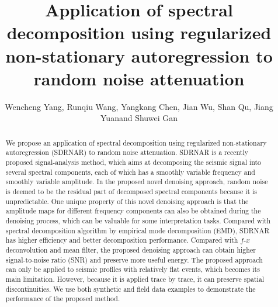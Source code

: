 
\title{Application of spectral decomposition using regularized non-stationary autoregression to random noise attenuation}
\renewcommand{\thefootnote}{\fnsymbol{footnote}}
\author{Wencheng Yang\footnotemark[1], Runqiu Wang\footnotemark[1], Yangkang Chen\footnotemark[2], Jian Wu\footnotemark[1], Shan Qu\footnotemark[1], Jiang Yuan\footnotemark[1] and Shuwei Gan\footnotemark[1]}
\address{
\footnotemark[1] State Key Laboratory of Petroleum Resources and Prospecting \\
China University of Petroleum \\
Fuxue Road 18th\\
Beijing, China, 102200 \\
ziyouqishi\_2014@163.com \\
\footnotemark[2]Bureau of Economic Geology \\
John A. and Katherine G. Jackson School of Geosciences \\
The University of Texas at Austin \\
University Station, Box X \\
Austin, TX 78713-8924 \\
Email: ykchen@utexas.edu
}

\DeclareRobustCommand{\dlo}[1]{}
\DeclareRobustCommand{\wen}[1]{#1}
\maketitle

\begin{abstract}

We propose an application of spectral decomposition using regularized non-stationary autoregression (SDRNAR) to random noise attenuation. SDRNAR is a recently proposed signal-analysis method, which aims at decomposing the seismic signal into several spectral components, each of which has a smoothly variable frequency and smoothly variable amplitude. 
In the proposed novel denoising approach, random noise is deemed to be the residual part of decomposed spectral components because it is unpredictable. 
One unique property of this novel denoising approach is that the amplitude maps 
for different frequency components can also be obtained during the denoising process, which can be valuable for some interpretation tasks. Compared with spectral decomposition algorithm by empirical mode decomposition (EMD), SDRNAR has higher efficiency and better decomposition performance. Compared with $f$-$x$ deconvolution\wen{ and mean filter}, the proposed denoising approach can obtain higher signal-to-noise ratio (SNR) and preserve more useful energy.  \wen{The proposed approach can only be applied to seismic profiles with relatively flat events, which becomes its main limitation. However, because it is applied trace by trace, it can preserve spatial discontinuities}. We use both synthetic and field data examples to demonstrate the performance of the proposed method. 

\end{abstract}

